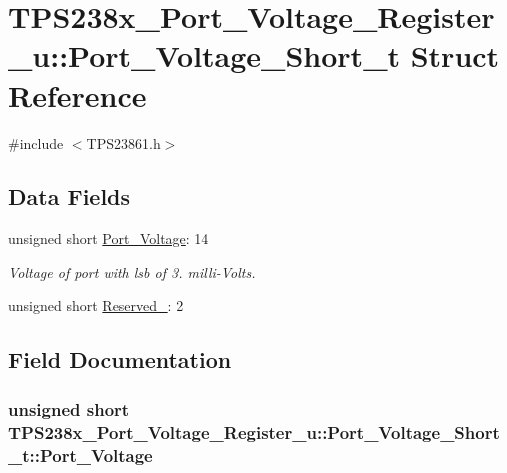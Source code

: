 \hypertarget{struct_t_p_s238x___port___voltage___register__u_1_1_port___voltage___short__t}{\section{T\-P\-S238x\-\_\-\-Port\-\_\-\-Voltage\-\_\-\-Register\-\_\-u\-:\-:Port\-\_\-\-Voltage\-\_\-\-Short\-\_\-t Struct Reference}
\label{struct_t_p_s238x___port___voltage___register__u_1_1_port___voltage___short__t}
}


{\ttfamily \#include $<$T\-P\-S23861.\-h$>$}

\subsection*{Data Fields}
\begin{DoxyCompactItemize}
\item 
unsigned short \hyperlink{struct_t_p_s238x___port___voltage___register__u_1_1_port___voltage___short__t_a5c4b0d15fb06cb6787f3147c34b0700c}{Port\-\_\-\-Voltage}\-: 14
\begin{DoxyCompactList}\small\item\em Voltage of port with lsb of 3. milli-\/\-Volts. \end{DoxyCompactList}\item 
unsigned short \hyperlink{struct_t_p_s238x___port___voltage___register__u_1_1_port___voltage___short__t_a91a7e6ab0161eeeef593d6810203ef4c}{Reserved\-\_}\-: 2
\end{DoxyCompactItemize}


\subsection{Field Documentation}
\hypertarget{struct_t_p_s238x___port___voltage___register__u_1_1_port___voltage___short__t_a5c4b0d15fb06cb6787f3147c34b0700c}{
\subsubsection[{Port\-\_\-\-Voltage}]{\setlength{\rightskip}{0pt plus 5cm}unsigned short T\-P\-S238x\-\_\-\-Port\-\_\-\-Voltage\-\_\-\-Register\-\_\-u\-::\-Port\-\_\-\-Voltage\-\_\-\-Short\-\_\-t\-::\-Port\-\_\-\-Voltage}}\label{struct_t_p_s238x___port___voltage___register__u_1_1_port___voltage___short__t_a5c4b0d15fb06cb6787f3147c34b0700c}



